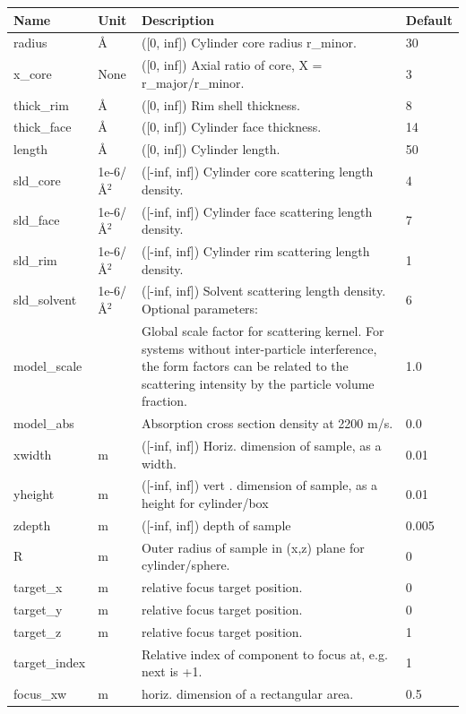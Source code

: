 \begin{longtable}{p{}p{}p{}p{}}
\toprule
\textbf{Name} & \textbf{Unit} & \textbf{Description} & \textbf{Default} \\
\midrule
\endhead
radius & \AA{} & ([0, inf]) Cylinder core radius r\_minor. & 30 \\
x\_core & None & ([0, inf]) Axial ratio of core, X = r\_major/r\_minor. & 3 \\
thick\_rim & \AA{} & ([0, inf]) Rim shell thickness. & 8 \\
thick\_face & \AA{} & ([0, inf]) Cylinder face thickness. & 14 \\
length & \AA{} & ([0, inf]) Cylinder length. & 50 \\
sld\_core & 1e-6/\AA{}$^{2}$ & ([-inf, inf]) Cylinder core scattering length density. & 4 \\
sld\_face & 1e-6/\AA{}$^{2}$ & ([-inf, inf]) Cylinder face scattering length density. & 7 \\
sld\_rim & 1e-6/\AA{}$^{2}$ & ([-inf, inf]) Cylinder rim scattering length density. & 1 \\
sld\_solvent & 1e-6/\AA{}$^{2}$ & ([-inf, inf]) Solvent scattering length density. Optional parameters: & 6 \\
model\_scale &   & Global scale factor for scattering kernel. For systems without inter-particle interference, the form factors can be related to the scattering intensity by the particle volume fraction. & 1.0 \\
model\_abs &   & Absorption cross section density at 2200 m/s. & 0.0 \\
xwidth & m & ([-inf, inf]) Horiz. dimension of sample, as a width. & 0.01 \\
yheight & m & ([-inf, inf]) vert . dimension of sample, as a height for cylinder/box & 0.01 \\
zdepth & m & ([-inf, inf]) depth of sample & 0.005 \\
R & m & Outer radius of sample in (x,z) plane for cylinder/sphere. & 0 \\
target\_x & m & relative focus target position. & 0 \\
target\_y & m & relative focus target position. & 0 \\
target\_z & m & relative focus target position. & 1 \\
target\_index &   & Relative index of component to focus at, e.g. next is +1. & 1 \\
focus\_xw & m & horiz. dimension of a rectangular area. & 0.5 \\

\end{longtable}
